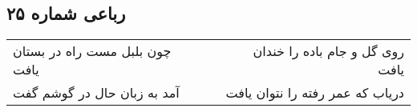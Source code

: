 \begin{center}
\section*{رباعی شماره ۲۵}
\label{sec:sh025}
\begin{longtable}{l p{0.5cm} r}
چون بلبل مست راه در بستان یافت
&&
روی گل و جام باده را خندان یافت
\\
آمد به زبان حال در گوشم گفت
&&
دریاب که عمر رفته را نتوان یافت
\\
\end{longtable}
\end{center}
